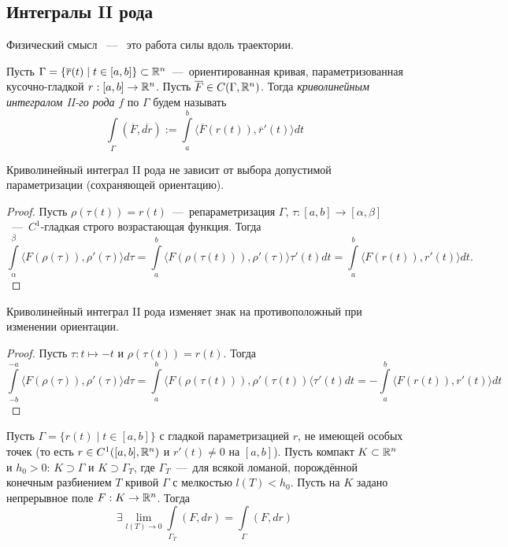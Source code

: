 \subsection{Интегралы II рода}
Физический смысл ~---~ это работа силы вдоль траектории.

\begin{definition}
    Пусть $\Gamma = \{\overline{r}(t) \mid t \in [a, b]\} \subset \mathbb{R}^n$~---~ориентированная кривая, параметризованная кусочно-гладкой $r: [a, b] \rightarrow \mathbb{R}^n$. Пусть $
    \overline{F} \in C(\Gamma, \mathbb{R}^n)$. Тогда \textit{криволинейным интегралом II-го рода} $f$ по $\Gamma$ будем называть \[\int\limits_\Gamma (\overline{F}, \overline{dr}) := \int\limits_a^b \langle \overline{F}(r(t)), \overline{r}'(t) \rangle dt\]
\end{definition}
\begin{lemma}
    Криволинейный интеграл II рода не зависит от выбора допустимой параметризации (сохраняющей ориентацию).
\end{lemma}
\begin{proof}
    Пусть $\rho(\tau(t)) = r(t)$~---~репараметризация $\Gamma$, $\tau: [a, b] \rightarrow [\alpha, \beta]$~---~$C^1$-гладкая строго возрастающая функция. Тогда \[\int\limits_\alpha^\beta \langle F(\rho(\tau)), \rho'(\tau)\rangle d\tau = \int\limits_a^b \langle F(\rho(\tau(t))), \rho'(\tau) \rangle \tau'(t) dt = \int\limits_a^b \langle F(r(t)), r'(t) \rangle dt.\]
\end{proof}
\begin{lemma}
    Криволинейный интеграл II рода изменяет знак на противоположный при изменении ориентации.
\end{lemma}
\begin{proof}
    Пусть $\tau: t \mapsto -t$ и $\rho(\tau(t)) = r(t)$. Тогда \[\int\limits_{-b}^{-a} \langle F(\rho(\tau)), \rho'(\tau) \rangle d\tau = \int\limits_a^b \langle F(\rho(\tau(t))), \rho'(\tau(t))\langle \tau'(t) dt = -\int\limits_a^b \langle F(r(t)), r'(t) \rangle dt\]
\end{proof}
\hypertarget{krivaya_lomanaya}{}
\begin{lemma}
    Пусть $\Gamma = \{r(t) \mid t \in [a, b]\}$ с гладкой параметризацией $r$, не имеющей особых точек (то есть $r \in C^1([a, b], \mathbb{R}^n)$ и $r'(t) \neq 0$ на $[a, b]$). Пусть компакт $K \subset \mathbb{R}^n$ и $h_0 > 0$: $K \supset \Gamma$ и $K \supset \Gamma_T$, где $\Gamma_T$~---~для всякой ломаной, порождённой конечным разбиением $T$ кривой $\Gamma$ с мелкостью $l(T) < h_0$. Пусть на $K$ задано непрерывное поле $F: K \rightarrow \mathbb{R}^n$. Тогда \[\exists \lim\limits_{l(T) \rightarrow 0} \int\limits_{\Gamma_T} (F, dr) = \int\limits_\Gamma (F, dr)\]
\end{lemma}
